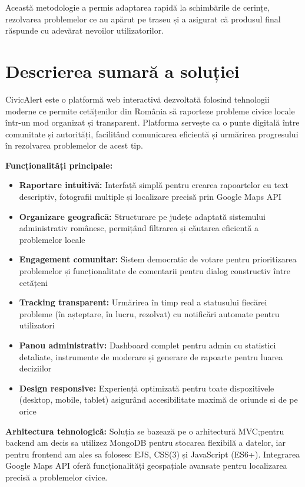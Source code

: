 \documentclass[12pt,a4paper]{report}
\begin{document}
Această metodologie a permis adaptarea rapidă la schimbările de cerințe, rezolvarea problemelor ce au apărut pe traseu și a asigurat că produsul final răspunde cu adevărat nevoilor utilizatorilor.

\section*{Descrierea sumară a soluției}

CivicAlert este o platformă web interactivă dezvoltată folosind tehnologii moderne  ce permite cetățenilor din România să raporteze probleme civice locale într-un mod organizat și transparent. Platforma servește ca o punte digitală între comunitate și autorități, facilitând comunicarea eficientă și urmărirea progresului în rezolvarea problemelor de acest tip.

\textbf{Funcționalități principale:}
\begin{itemize}
\item \textbf{Raportare intuitivă:} Interfață simplă pentru crearea rapoartelor cu text descriptiv, fotografii multiple și localizare precisă prin Google Maps API
\item \textbf{Organizare geografică:} Structurare pe județe adaptată sistemului administrativ românesc, permițând filtrarea și căutarea eficientă a problemelor locale
\item \textbf{Engagement comunitar:} Sistem democratic de votare pentru prioritizarea problemelor și funcționalitate de comentarii pentru dialog constructiv între cetățeni
\item \textbf{Tracking transparent:} Urmărirea în timp real a statusului fiecărei probleme (în așteptare, în lucru, rezolvat) cu notificări automate pentru utilizatori
\item \textbf{Panou administrativ:} Dashboard complet pentru admin cu statistici detaliate, instrumente de moderare și generare de rapoarte pentru luarea deciziilor
\item \textbf{Design responsive:} Experiență optimizată pentru toate dispozitivele (desktop, mobile, tablet) asigurând accesibilitate maximă de oriunde si de pe orice
\end{itemize}

\textbf{Arhitectura tehnologică:}
Soluția se bazează pe o arhitectură MVC;pentru backend am decis sa utilizez MongoDB pentru stocarea flexibilă a datelor, iar pentru frontend am ales sa folosesc  EJS, CSS(3) și JavaScript (ES6+). Integrarea Google Maps API oferă funcționalități geospațiale avansate pentru localizarea precisă a problemelor civice.
\end{document}
